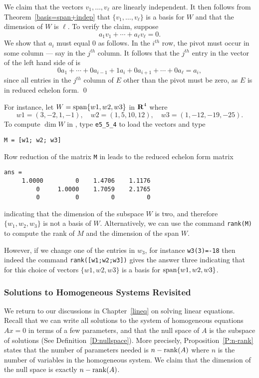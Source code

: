 \documentclass{ximera}
\begin{document}
We claim that the vectors $v_1,\ldots,v_\ell$ are linearly
independent.  It then follows from Theorem~\ref{basis=span+indep} that
$\{v_1,\ldots,v_\ell\}$ is a basis for $W$ and that the dimension of
$W$ is $\ell$.  To verify the claim, suppose
\begin{equation} \label{e:rowsums}
a_1v_1 + \cdots + a_\ell v_\ell = 0.
\end{equation}
We show that $a_i$ must equal $0$ as follows.  In the $i^{th}$
row, the pivot must occur in some column --- say in the $j^{th}$
column.  It follows that the $j^{th}$ entry in the vector of the
left hand side of  is
\[
0a_1 + \cdots + 0a_{i-1} +1a_i + 0a_{i+1} + \cdots + 0a_\ell =
a_i,
\]
since all entries in the $j^{th}$ column of $E$ other than the
pivot must be zero, as $E$ is in reduced echelon form.  \qed

For instance, let $W={\rm span}\{w1,w2,w3\}$ in $\mbox{$\bf{R}$}^4$ where
\begin{equation*} \label{eq:vectors}
w1 = (3, -2, 1,-1), \quad w2 = (1,5,10,12), \quad
w3 = (1,-12,-19,-25).
\end{equation*}%
To compute $\dim W$ in \Matlab, type \verb+e5_5_4+ to load the
vectors and type
\begin{verbatim}
M = [w1; w2; w3]
\end{verbatim}
Row reduction of the matrix {\tt M} in \Matlab
leads to the reduced echelon form matrix
\begin{verbatim}
ans =
     1.0000         0    1.4706    1.1176
         0     1.0000    1.7059    2.1765
         0          0         0         0
\end{verbatim}
indicating that the dimension of the subspace $W$ is two, and
therefore $\{w_1,w_2,w_3\}$ is not a basis of $W$. Alternatively,
we can use the \Matlab command {\tt rank(M)}
to compute the rank of $M$ and the dimension of the span $W$.

However, if we change one of the entries in $w_3$, for instance
{\tt w3(3)=-18} then indeed the command {\tt rank([w1;w2;w3])}
gives the answer three indicating that for this choice of vectors
$\{w1,w2,w3\}$ is a basis for ${\rm span}\{w1,w2,w3\}$.

\subsubsection*{Solutions to Homogeneous Systems Revisited}

We return to our discussions in Chapter~\ref{lineq} on solving
linear equations.  Recall that we can write all solutions to
the system of homogeneous equations $Ax=0$ in terms of a few
parameters, and that the null space of $A$ is the subspace of
solutions (See Definition~\ref{D:nullspace}).
More precisely, Proposition~\ref{P:n-rank} states that the number of
parameters needed is $n-{\rm rank}(A)$ where $n$ is the number of
variables in the homogeneous system.  We claim that the dimension
of the null space is exactly
$n - {\rm rank}(A)$.
\end{document}
